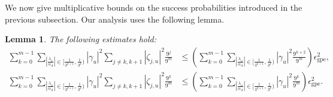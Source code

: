 \documentclass[letterpaper,onecolumn,11pt,accepted=2026-02-14]{quantumarticle}
\newcommand{\abs}[1]{\left\lvert#1\right\rvert}
\newtheorem{lemma}{Lemma}
\theoremstyle{remark}
\theoremstyle{plain}
\begin{document}
We now give multiplicative bounds on the success probabilities introduced in the previous subsection. Our analysis uses the following lemma.
\begin{lemma}
\label{lem:multi_lem}
The following estimates hold:
\begin{equation}
\begin{aligned}
    \sum_{k=0}^{m-1}\sum_{\abs{\frac{\lambda_u}{\alpha_A}}\in\big[\frac{1}{3^{k+1}},\frac{1}{3^k}\big)}
    \abs{\gamma_u}^2
    \sum_{j\neq k,k+1}\abs{\zeta_{j,u}}^2\frac{9^{j}}{9^m}
    &\leq\left(\sum_{k=0}^{m-1}\sum_{\abs{\frac{\lambda_u}{\alpha_A}}\in\big[\frac{1}{3^{k+1}},\frac{1}{3^k}\big)}
    \abs{\gamma_u}^2
    \frac{9^{k+2}}{9^m}\right)\epsilon_{\text{gpe}}^2,\\
    \sum_{k=0}^{m-1}\sum_{\abs{\frac{\lambda_u}{\alpha_A}}\in\big[\frac{1}{3^{k+1}},\frac{1}{3^k}\big)}
    \abs{\gamma_u}^2
    \sum_{j\neq k,k+1}\abs{\zeta_{j,u}}^2\frac{9^{k}}{9^m}
    &\leq\left(\sum_{k=0}^{m-1}\sum_{\abs{\frac{\lambda_u}{\alpha_A}}\in\big[\frac{1}{3^{k+1}},\frac{1}{3^k}\big)}
    \abs{\gamma_u}^2
    \frac{9^{k}}{9^m}\right)\epsilon_{\text{gpe}}^2.
\end{aligned}
\end{equation}
\end{lemma}
\end{document}
